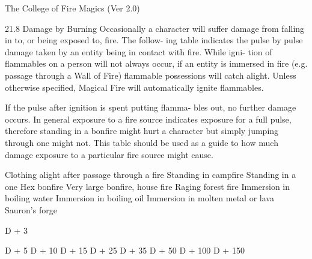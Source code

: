 \begin{Chapter}{The College of Fire Magics (Ver 2.0)}
 

21.8 Damage by Burning 
Occasionally  a  character  will  suffer  damage  from 
falling in to, or being exposed to, fire. The follow-
ing table indicates the pulse by pulse damage taken 
by an entity being in contact with fire. While igni-
tion  of  flammables  on  a  person  will  not  always 
occur, if an entity is immersed in fire (e.g. passage 
through a Wall of Fire) flammable possessions will 
catch  alight.  Unless  otherwise  specified,  Magical 
Fire will automatically ignite flammables. 

If  the  pulse  after  ignition is  spent putting  flamma-
bles  out,  no  further  damage  occurs.  In  general 
exposure  to  a  fire  source  indicates  exposure  for  a 
full  pulse,  therefore  standing  in  a  bonfire  might 
hurt  a  character  but  simply  jumping  through  one 
might not. This table should be used as a guide to 
how  much  damage  exposure  to  a  particular  fire 
source might cause. 

Clothing alight after passage through 
a fire 
Standing in campfire 
Standing in a one Hex bonfire 
Very large bonfire, house fire 
Raging forest fire 
Immersion in boiling water 
Immersion in boiling oil 
Immersion in molten metal or lava 
Sauron’s forge 

D + 3 

D + 5 
D + 10 
D + 15 
D + 25 
D + 35 
D + 50 
D + 100 
D + 150 

\end{Chapter}
